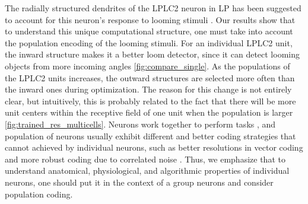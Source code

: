 \documentclass[9pt,lineno]{elife}
\begin{document}








The radially structured dendrites of the LPLC2 neuron in LP has been suggested to account for this neuron's response to looming stimuli \citep{klapoetke2017ultra}. Our results show that to understand this unique computational structure, one must take into account the population encoding of the looming stimuli. For an individual LPLC2 unit, the inward structure makes it a better loom detector, since it can detect looming objects from more incoming angles \ref{fig:compare_single}. As the populations of the LPLC2 units increases, the outward structures are selected more often than the inward ones during optimization. The reason for this change is not entirely clear, but intuitively, this is probably related to the fact that there will be more unit centers within the receptive field of one unit when the population is larger \ref{fig:trained_res_multicells}. Neurons work together to perform tasks \citep{pasupathy2002population}, and population of neurons usually exhibit different and better coding strategies that cannot achieved by individual neurons, such as better resolutions in vector coding \citep{georgopoulos1986neuronal,vogels1990population} and more robust coding due to correlated noise \citep{franke2016structures,zylberberg2016direction,cafaro2020global}. Thus, we emphasize that to understand anatomical, physiological, and algorithmic properties of individual neurons, one should put it in the context of a group neurons and consider population coding.
\end{document}
